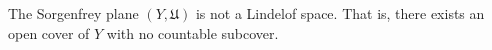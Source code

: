 The Sorgenfrey plane $(Y, \mathfrak{U})$ is not a Lindelof space. That is, there exists an open cover of $Y$ with no countable subcover.
